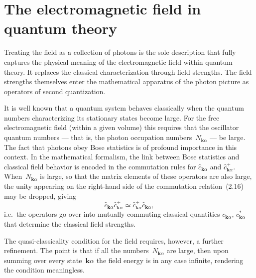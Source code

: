 \section{The electromagnetic field in quantum theory}

Treating the field as a collection of photons is the sole description that fully captures the physical meaning of the electromagnetic field within quantum theory. It replaces the classical characterization through field strengths. The field strengths themselves enter the mathematical apparatus of the photon picture as operators of second quantization.

It is well known that a quantum system behaves classically when the quantum numbers characterizing its stationary states become large. For the free electromagnetic field (within a given volume) this requires that the oscillator quantum numbers --- that is, the photon occupation numbers~$N_{\mathbf{k}\alpha}$ --- be large. The fact that photons obey Bose statistics is of profound importance in this context. In the mathematical formalism, the link between Bose statistics and classical field behavior is encoded in the commutation rules for $\hat{c}_{\mathbf{k}\alpha}$ and $\hat{c}^+_{\mathbf{k}\alpha}$. When~$N_{\mathbf{k}\alpha}$ is large, so that the matrix elements of these operators are also large, the unity appearing on the right-hand side of the commutation relation~(2.16) may be dropped, giving
\[
\hat{c}_{\mathbf{k}\alpha}\hat{c}^+_{\mathbf{k}\alpha} \simeq \hat{c}^+_{\mathbf{k}\alpha}\hat{c}_{\mathbf{k}\alpha},
\]
i.e.\ the operators go over into mutually commuting classical quantities $c_{\mathbf{k}\alpha}$, $c^*_{\mathbf{k}\alpha}$ that determine the classical field strengths.

The quasi-classicality condition for the field requires, however, a further refinement. The point is that if all the numbers~$N_{\mathbf{k}\alpha}$ are large, then upon summing over every state~$\mathbf{k}\alpha$ the field energy is in any case infinite, rendering the condition meaningless.

